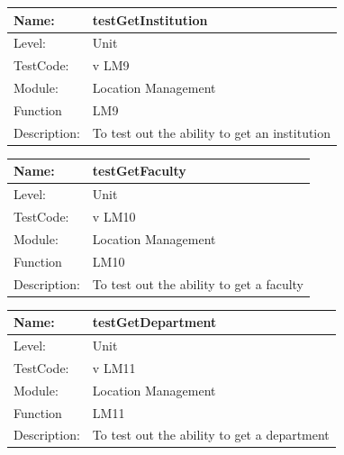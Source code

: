 \documentclass[12pt]{article}
\begin{document}
\begin{center}
\begin{tabular}{|l|p{12cm}|}
\hline

 Name: & testGetInstitution \\
 \hline
Level: & Unit \\
\hline
TestCode: & v LM9 \\
\hline
Module:& Location Management \\
\hline
Function & LM9 \\
\hline
Description: & To test out the ability to get an institution  \\
\hline
\end{tabular}
\end{center}

\begin{center}
\begin{tabular}{|l|p{12cm}|}
\hline

 Name: & testGetFaculty \\
 \hline
Level: & Unit \\
\hline
TestCode: & v LM10 \\
\hline
Module:& Location Management \\
\hline
Function & LM10 \\
\hline
Description: & To test out the ability to get a faculty \\
\hline
\end{tabular}
\end{center}

\begin{center}
\begin{tabular}{|l|p{12cm}|}
\hline

 Name: & testGetDepartment \\
 \hline
Level: & Unit \\
\hline
TestCode: & v LM11 \\
\hline
Module:& Location Management \\
\hline
Function & LM11 \\
\hline
Description: & To test out the ability to get a department \\
\hline
\end{tabular}
\end{center}
\end{document}
